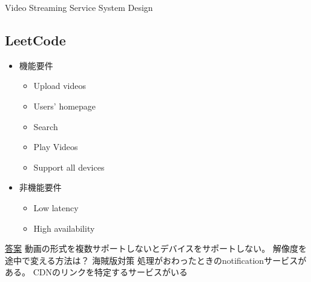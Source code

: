 \documentclass{jlreq}
\begin{document}
\begin{section-bib}{Video Streaming Service System Design}
  \subsection{LeetCode}
  \begin{itemize}
  \item 機能要件
    \begin{itemize}
    \item Upload videos
    \item Users' homepage
    \item Search
    \item Play Videos
    \item Support all devices
    \end{itemize}
  \item 非機能要件
    \begin{itemize}
    \item Low latency
    \item High availability
    \end{itemize}
  \end{itemize}
  \href{https://docs.google.com/drawings/d/1GL0j7JJm0ip7DnNsdWOHBbfoHmz5U1LwwcTsbRD7IZ4/edit}{答案}
  動画の形式を複数サポートしないとデバイスをサポートしない。
  解像度を途中で変える方法は？
  海賊版対策
  処理がおわったときのnotificationサービスがある。
  CDNのリンクを特定するサービスがいる
\end{section-bib}
\end{document}

